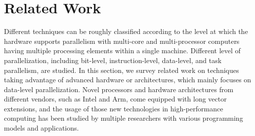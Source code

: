\documentclass[5p,times,twocolumn]{elsarticle}
\begin{document}
\section{Related Work}\label{sec:related}
Different techniques can be roughly classified according to the level at which
the hardware supports parallelism with multi-core and multi-processor computers having
multiple processing elements within a single machine. Different level of parallelization,
including bit-level, instruction-level, data-level, and task parallelism, are studied.
%
In this section, we survey related work on techniques taking advantage of
advanced hardware or architectures, which mainly focuses on data-level parallelization.
Novel processors and hardware architectures from different vendors, such as Intel and Arm,
come equipped with long vector extensions, and the usage of those new technologies in high-performance computing has been
studied by multiple researchers with various programming models and applications.
%
\end{document}
